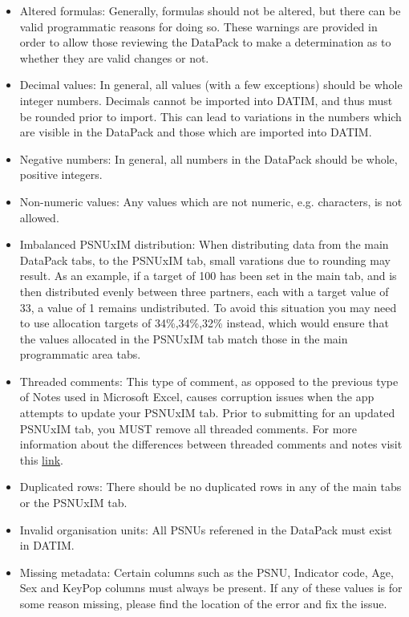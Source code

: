 \documentclass[
  openany]{book}
\begin{document}
\begin{itemize}
\item
  Altered formulas: Generally, formulas should not be altered, but
  there can be valid programmatic reasons for doing so. These warnings
  are provided in order to allow those reviewing the DataPack to make
  a determination as to whether they are valid changes or not.
\item
  Decimal values: In general, all values (with a few exceptions)
  should be whole integer numbers. Decimals cannot be imported into
  DATIM, and thus must be rounded prior to import. This can lead to
  variations in the numbers which are visible in the DataPack and
  those which are imported into DATIM.
\item
  Negative numbers: In general, all numbers in the DataPack should be
  whole, positive integers.
\item
  Non-numeric values: Any values which are not numeric, e.g.
  characters, is not allowed.
\item
  Imbalanced PSNUxIM distribution: When distributing data from the
  main DataPack tabs, to the PSNUxIM tab, small varations due to
  rounding may result. As an example, if a target of 100 has been set
  in the main tab, and is then distributed evenly between three
  partners, each with a target value of 33, a value of 1 remains
  undistributed. To avoid this situation you may need to use
  allocation targets of 34\%,34\%,32\% instead, which would ensure that
  the values allocated in the PSNUxIM tab match those in the main
  programmatic area tabs.
\item
  Threaded comments: This type of comment, as opposed to the previous
  type of Notes used in Microsoft Excel, causes corruption issues when
  the app attempts to update your PSNUxIM tab. Prior to submitting for
  an updated PSNUxIM tab, you MUST remove all threaded comments. For
  more information about the differences between threaded comments and
  notes visit this
  \href{https://support.office.com/en-us/article/the-difference-between-threaded-comments-and-notes-75a51eec-4092-42ab-abf8-7669077b7be3}{link}.
\item
  Duplicated rows: There should be no duplicated rows in any of the
  main tabs or the PSNUxIM tab.
\item
  Invalid organisation units: All PSNUs referened in the DataPack must
  exist in DATIM.
\item
  Missing metadata: Certain columns such as the PSNU, Indicator code,
  Age, Sex and KeyPop columns must always be present. If any of these
  values is for some reason missing, please find the location of the
  error and fix the issue.
\end{itemize}
\end{document}
